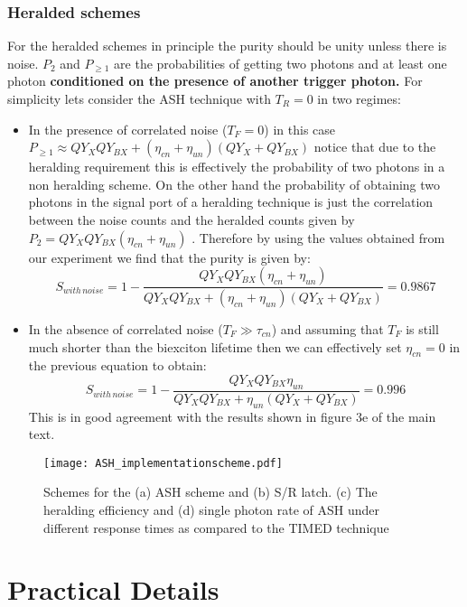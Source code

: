 \documentclass[reprint,onecolumn]{revtex4-1}
\begin{document}
\subsubsection*{Heralded schemes}

For the heralded schemes in principle the purity should be unity unless
there is noise. $P_{2}$ and $P_{\ge1}$
are the probabilities of getting two photons and at least one photon
\textbf{conditioned on the presence of another trigger photon.} For
simplicity lets consider the ASH technique with $T_{R}=0$ in two
regimes:
\begin{itemize}
\item In the presence of correlated noise ($T_{F}=0$) in this case $P_{\ge1}\approx QY_{X}QY_{BX}+\left(\eta_{cn}+\eta_{un}\right)\left(QY_{X}+QY_{BX}\right)$
notice that due to the heralding requirement this is effectively the
probability of two photons in a non heralding scheme. On the other
hand the probability of obtaining two photons in the signal port of
a heralding technique is just the correlation between the noise counts
and the heralded counts given by $P_{2}=QY_{X}QY_{BX}\left(\eta_{cn}+\eta_{un}\right)$
. Therefore by using the values obtained from our experiment we find
that the purity is given by:
\[
S_{with\,noise}=1-\frac{QY_{X}QY_{BX}\left(\eta_{cn}+\eta_{un}\right)}{QY_{X}QY_{BX}+\left(\eta_{cn}+\eta_{un}\right)\left(QY_{X}+QY_{BX}\right)}=0.9867
\]
\item In the absence of correlated noise ($T_{F}\gg\tau_{cn}$) and assuming
that $T_{F}$ is still much shorter than the biexciton lifetime then
we can effectively set $\eta_{cn}=0$ in the previous equation to
obtain:
\[
S_{with\,noise}=1-\frac{QY_{X}QY_{BX}\eta_{un}}{QY_{X}QY_{BX}+\eta_{un}\left(QY_{X}+QY_{BX}\right)}=0.996
\]
This is in good agreement with the results shown in figure 3e of the
main text. 
\end{itemize}

\begin{figure}[ht!]
\begin{centering}
\texttt{[image: ASH\_implementationscheme.pdf]}
\par\end{centering}
\caption{Schemes for the (a) ASH scheme and (b) S/R latch. (c) The heralding efficiency and (d) single photon rate of ASH under different response times as compared to the TIMED technique  \label{fig:Implementation}}
\end{figure}

\section{Practical Details}
\end{document}
